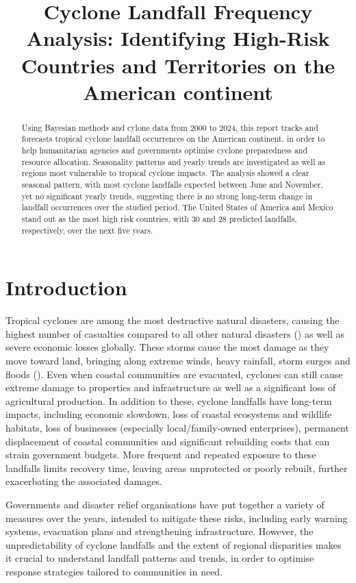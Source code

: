 \documentclass[
]{article}
\title{Cyclone Landfall Frequency Analysis: Identifying High-Risk Countries and Territories on the American continent}
\author{}
\date{\vspace{-2.5em}}
\begin{document}
\maketitle
\begin{abstract}
Using Bayesian methods and cylone data from 2000 to 2024, this report tracks and forecasts tropical cyclone landfall occurrences on the American continent, in order to help humanitarian agencies and governments optimise cyclone preparedness and resource allocation. Seasonality patterns and yearly trends are investigated as well as regions most vulnerable to tropical cyclone impacts. The analysis showed a clear seasonal pattern, with most cyclone landfalls expected between June and November, yet no significant yearly trends, suggesting there is no strong long-term change in landfall occurrences over the studied period. The United States of America and Mexico stand out as the most high risk countries, with 30 and 28 predicted landfalls, respectively, over the next five years.
\end{abstract}

{
\setcounter{tocdepth}{2}
\tableofcontents
}
\section{Introduction}\label{introduction}

Tropical cyclones are among the most destructive natural disasters, causing the highest number of casualties compared to all other natural disasters () as well as severe economic losses globally. These storms cause the most damage as they move toward land, bringing along extreme winds, heavy rainfall, storm surges and floods (). Even when coastal communities are evacuated, cyclones can still cause extreme damage to properties and infrastructure as well as a significant loss of agricultural production. In addition to these, cyclone landfalls have long-term impacts, including economic slowdown, loss of coastal ecosystems and wildlife habitats, loss of businesses (especially local/family-owned enterprises), permanent displacement of coastal communities and significant rebuilding costs that can strain government budgets. More frequent and repeated exposure to these landfalls limits recovery time, leaving areas unprotected or poorly rebuilt, further exacerbating the associated damages.

Governments and disaster relief organisations have put together a variety of measures over the years, intended to mitigate these risks, including early warning systems, evacuation plans and strengthening infrastructure. However, the unpredictability of cyclone landfalls and the extent of regional disparities makes it crucial to understand landfall patterns and trends, in order to optimise response strategies tailored to communities in need.
\end{document}

